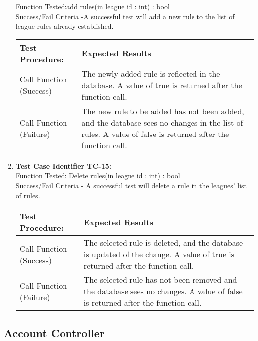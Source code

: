 \begin{enumerate}
    Function Tested:add rules(in league id : int) : bool\\

    Success/Fail Criteria -A successful test will add a new rule to the list of
    league rules already established.  \\

    \begin{longtable}{|p{2in}|p{4.5in}|}
    \hline
    {\large \color{color1}Test Procedure:}&{\large \color{color1}Expected Results}\\ \hline
    Call Function (Success) &The newly added rule is reflected in the database.
    A value of true is returned after the function call.
    \\ \hline
    Call Function (Failure) & The new rule to be added has not been added, and
    the database sees no changes in the list of rules. A value of false is
    returned after the function call.\\ \hline
    \end{longtable}
    \vspace{5mm}

  \item
    \textbf{Test Case Identifier TC-15:}\\

    Function Tested: Delete rules(in league id : int) : bool\\

    Success/Fail Criteria - A successful test will delete a rule in the
    leagues’ list of rules. \\

    \begin{longtable}{|p{2in}|p{4.5in}|}
    \hline
    {\large \color{color1}Test Procedure:}&{\large \color{color1}Expected Results}\\ \hline
    Call Function (Success) & The selected rule is deleted, and the database is
    updated of the change. A value of true is returned after the function call.
    \\ \hline
    Call Function (Failure) & The selected rule has not been removed and the
    database sees no changes. A value of false is returned after the function
    call.\\ \hline
    \end{longtable}
    \vspace{5mm}
  \end{enumerate}

\subsection{Account Controller}

